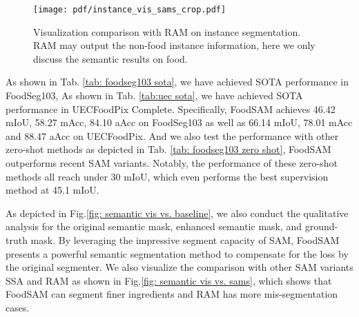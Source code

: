 \documentclass[lettersize,journal]{IEEEtran}
\begin{document}
\begin{figure*}[tbh]
\centering
\newpage
\texttt{[image: pdf/instance\_vis\_sams\_crop.pdf]}
\caption{Visualization comparison with RAM on instance segmentation. RAM may output the non-food instance information, here we only discuss the semantic results on food.}
\label{fig: instance vis vs. sams}
\end{figure*}




As shown in Tab. \ref{tab: foodseg103 sota}, we have achieved SOTA performance in FoodSeg103, 
As shown in Tab. \ref{tab:uec sota}, we have achieved SOTA performance in UECFoodPix Complete. 
Specifically, FoodSAM achieves 46.42 mIoU, 58.27 mAcc, 84.10 aAcc on FoodSeg103 as well as 66.14 mIoU, 78.01 mAcc and 88.47 aAcc on UECFoodPix.
And we also test the performance with other zero-shot methods as depicted in Tab. \ref{tab: foodseg103 zero shot}, FoodSAM outperforms recent SAM variants. 
Notably, the performance of these zero-shot methods all reach under 30 mIoU, which even performs the best supervision method at 45.1 mIoU.

As depicted in Fig.\ref{fig: semantic vis vs. baseline}, we also conduct the qualitative analysis for the original semantic mask, enhanced semantic mask, and ground-truth mask. 
By leveraging the impressive segment capacity of SAM, FoodSAM presents a powerful semantic segmentation method to compensate for the loss by the original segmenter. 
We also visualize the comparison with other SAM variants SSA and RAM as shown in Fig.\ref{fig: semantic vis vs. sams}, which shows that FoodSAM can segment finer ingredients and RAM has more mis-segmentation cases.

\begin{table*}[htbp]
\centering
\caption{Comparison with Zero-shot Methods on FoodSeg103}
\captionsetup{justification=centering}
\label{tab: foodseg103 zero shot}
\end{table*} 
\end{document}
